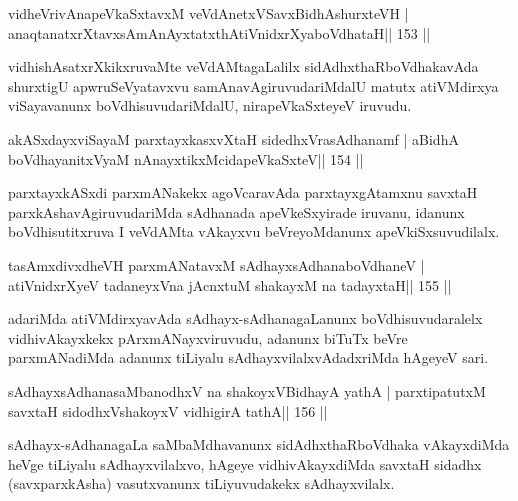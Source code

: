 
\begin{shl}
vidheVrivAnapeVkaSxtavxM veVdAnetxVSavxBidhAshurxteVH |
anaqtanatxrXtavxsAmAnAyxtatxthA\s tiVnidxrXyaboVdhataH\hfill || 153 ||
\end{shl}

\begin{artha}
vidhishAsatxrXkikxruvaMte veVdAMtagaLalilx sidAdhxthaRboVdhakavAda shurxtigU apwru\-SeVyatavxvu samAnavAgiruvudariMdalU matutx atiVMdirxya viSayavanunx boVdhisuvudariMdalU, nirapeVkaSxteyeV iruvudu.
\end{artha}

\begin{shl}
akASxdayxviSayaM parxtayxkasxvXtaH sidedhxVrasAdhanamf |
aBidhA boVdhayanitxVyaM nAnayxtikxMcidapeVkaSxteV\hfill || 154 ||
\end{shl}

\begin{artha}
parxtayxkASxdi parxmANakekx agoVcaravAda parxtayxgAtamxnu savxtaH parxkAshavAgiruvudariMda sAdhanada apeVkeSxyirade iruvanu, idanunx boVdhisutitxruva I veVdAMta vAkayxvu beVreyoMdanunx apeVkiSxsuvudilalx.
\end{artha}

\begin{shl}
tasAmxdivxdheVH parxmANatavxM sAdhayxsAdhanaboVdhaneV |
atiVnidxrXyeV tadaneyxVna jAcnxtuM shakayxM na tadayxtaH\hfill || 155 ||
\end{shl}

\begin{artha}
adariMda atiVMdirxyavAda sAdhayx-sAdhanagaLanunx boVdhisuvudaralelx vidhivAkayxkekx pArxmANayxviruvudu, adanunx biTuTx beVre parxmANadiMda adanunx tiLiyalu sAdhayxvilalx\-vAdadxriMda hAgeyeV sari.
\end{artha}

\begin{shl}
sAdhayxsAdhanasaMbanodhxV na shakoyxV\s BidhayA yathA |
parxtipatutxM savxtaH sidodhxV\s shakoyxV vidhigirA tathA\hfill || 156 ||
\end{shl}

\begin{artha}
sAdhayx-sAdhanagaLa saMbaMdhavanunx sidAdhxthaRboVdhaka vAkayxdiMda heVge tiLiyalu sAdhayxvilalxvo, hAgeye vidhivAkayxdiMda savxtaH sidadhx (savxparxkAsha) vasutxvanunx \-tiLiyuvudakekx sAdhayxvilalx.
\end{artha}

